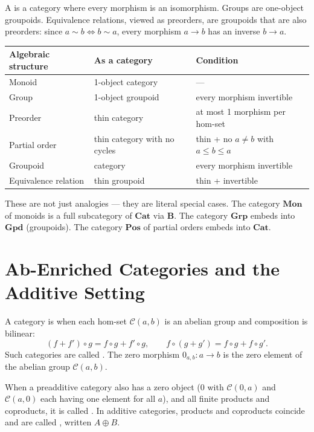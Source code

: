 A  is a category where every morphism is an isomorphism.
Groups are one-object groupoids. Equivalence relations, viewed as preorders,
are groupoids that are also preorders: since $a \sim b \Leftrightarrow b \sim a$,
every morphism $a \to b$ has an inverse $b \to a$.

\begin{center}
\renewcommand{\arraystretch}{1.4}
\begin{tabular}{lll}
\hline
\textbf{Algebraic structure} & \textbf{As a category} & \textbf{Condition} \\
\hline
Monoid & 1-object category & --- \\
Group & 1-object groupoid & every morphism invertible \\
Preorder & thin category & at most 1 morphism per hom-set \\
Partial order & thin category with no cycles & thin + no $a \neq b$ with $a \leq b \leq a$ \\
Groupoid & category & every morphism invertible \\
Equivalence relation & thin groupoid & thin + invertible \\
\hline
\end{tabular}
\end{center}

These are not just analogies — they are literal special cases. The category
$\mathbf{Mon}$ of monoids is a full subcategory of $\mathbf{Cat}$ via $\mathbf{B}$.
The category $\mathbf{Grp}$ embeds into $\mathbf{Gpd}$ (groupoids). The category
$\mathbf{Pos}$ of partial orders embeds into $\mathbf{Cat}$.

\section{Ab-Enriched Categories and the Additive Setting}

A category is  when each hom-set $\mathcal{C}(a,b)$
is an abelian group and composition is bilinear:
\[
  (f + f') \circ g = f \circ g + f' \circ g,
  \qquad
  f \circ (g + g') = f \circ g + f \circ g'.
\]
Such categories are called . The zero morphism $0_{a,b} : a \to b$
is the zero element of the abelian group $\mathcal{C}(a,b)$.

When a preadditive category also has a zero object ($0$ with $\mathcal{C}(0,a)$ and
$\mathcal{C}(a,0)$ each having one element for all $a$), and all finite products
and coproducts, it is called . In additive categories, products and
coproducts coincide and are called , written $A \oplus B$.

